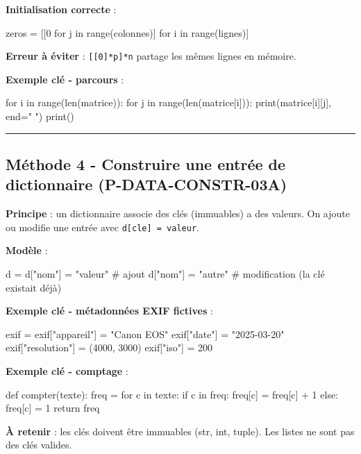 \textbf{Initialisation correcte} :

\begin{python}
zeros = [[0 for j in range(colonnes)] for i in range(lignes)]
\end{python}

\textbf{Erreur à éviter} : \texttt{{[}{[}0{]}*p{]}*n} partage les mêmes
lignes en mémoire.

\textbf{Exemple clé - parcours} :

\begin{python}
for i in range(len(matrice)):
    for j in range(len(matrice[i])):
        print(matrice[i][j], end=" ")
    print()
\end{python}

\begin{center}\rule{0.5\linewidth}{0.5pt}\end{center}

\subsection{Méthode 4 - Construire une entrée de dictionnaire (P-DATA-CONSTR-03A)}

\textbf{Principe} : un dictionnaire associe des clés (immuables) a des
valeurs. On ajoute ou modifie une entrée avec
\texttt{d{[}cle{]}\ =\ valeur}.

\textbf{Modèle} :

\begin{python}
d = {}
d["nom"] = "valeur"     # ajout
d["nom"] = "autre"      # modification (la clé existait déjà)
\end{python}

\textbf{Exemple clé - métadonnées EXIF fictives} :

\begin{python}
exif = {}
exif["appareil"] = "Canon EOS"
exif["date"] = "2025-03-20"
exif["resolution"] = (4000, 3000)
exif["iso"] = 200
\end{python}

\textbf{Exemple clé - comptage} :

\begin{python}
def compter(texte):
    freq = {}
    for c in texte:
        if c in freq:
            freq[c] = freq[c] + 1
        else:
            freq[c] = 1
    return freq
\end{python}

\textbf{À retenir} : les clés doivent être immuables (str, int, tuple).
Les listes ne sont pas des clés valides.

